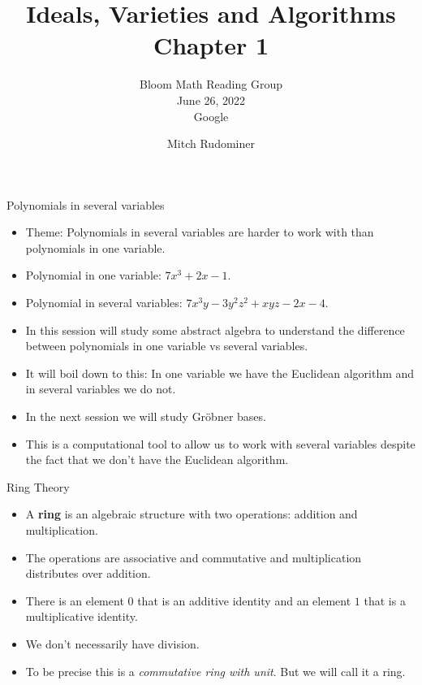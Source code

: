 \documentclass{beamer}
\title{Ideals, Varieties and Algorithms \\ Chapter 1}
\subtitle{Bloom Math Reading Group \\ June 26, 2022 \\ Google}
\author{Mitch Rudominer}
\date{}
\begin{document}
\begin{frame}
  \titlepage
\end{frame}

\begin{frame}{Polynomials in several variables}


\begin{itemize}
  \item Theme: Polynomials in several variables are harder to work with than polynomials in one variable.
  \item Polynomial in one variable: $7x^3 + 2x - 1$.
  \item Polynomial in several variables: $7x^3y - 3y^2z^2 + xyz -2x - 4$.
  \item In this session will study some abstract algebra to understand the difference between polynomials in one variable vs several variables.
  \item It will boil down to this: In one variable we have the Euclidean algorithm and in several variables we do not.
  \item In the next session we will study Gr\"{o}bner bases.
  \item This is a computational tool to allow us to work with several variables despite the fact that we don't have the Euclidean algorithm.
\end{itemize}

\end{frame}



\begin{frame}{Ring Theory}

\begin{itemize}
  \item A \textbf{ring} is an algebraic structure with two operations: addition and multiplication.
  \item The operations are associative and commutative and multiplication distributes over addition.
  \item There is an element $0$ that is an additive identity and an element $1$ that is a multiplicative identity.
  \item We don't necessarily have division.
  \item To be precise this is a \emph{commutative ring with unit}. But we will call it a ring.
\end{itemize}

\end{frame}
\end{document}

